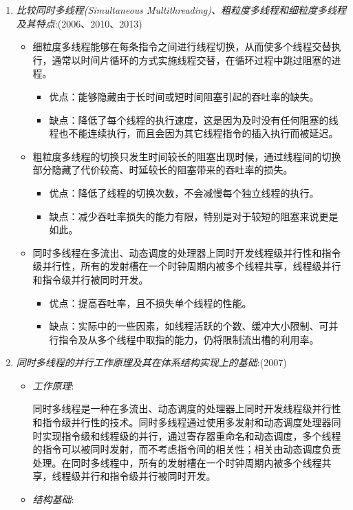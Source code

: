 \documentclass[a4paper]{ctexart}
\begin{document}
\begin{enumerate}
  \item \emph{比较同时多线程(Simultaneous Multithreading)、粗粒度多线程和细粒度多线程及其特点}:(2006、2010、2013)
  \begin{itemize}
    \item 细粒度多线程能够在每条指令之间进行线程切换，从而使多个线程交替执行，通常以时间片循环的方式实施线程交替，在循环过程中跳过阻塞的进程。
    \begin{itemize}
      \item 优点：能够隐藏由于长时间或短时间阻塞引起的吞吐率的缺失。
      \item 缺点：降低了每个线程的执行速度，这是因为及时没有任何阻塞的线程也不能连续执行，而且会因为其它线程指令的插入执行而被延迟。
    \end{itemize}
    \item 粗粒度多线程的切换只发生时间较长的阻塞出现时候，通过线程间的切换部分隐藏了代价较高、时延较长的阻塞带来的吞吐率的损失。
    \begin{itemize}
      \item 优点：降低了线程的切换次数，不会减慢每个独立线程的执行。
      \item 缺点：减少吞吐率损失的能力有限，特别是对于较短的阻塞来说更是如此。
    \end{itemize}
    \item 同时多线程在多流出、动态调度的处理器上同时开发线程级并行性和指令级并行性，所有的发射槽在一个时钟周期内被多个线程共享，线程级并行和指令级并行被同时开发。
    \begin{itemize}
      \item 优点：提高吞吐率，且不损失单个线程的性能。
      \item 缺点：实际中的一些因素，如线程活跃的个数、缓冲大小限制、可并行指令及从多个线程中取指的能力，仍将限制流出槽的利用率。
    \end{itemize}
  \end{itemize}
  
  \item \emph{同时多线程的并行工作原理及其在体系结构实现上的基础}:(2007)
  \begin{itemize}
    \item \emph{工作原理}:
    
    同时多线程是一种在多流出、动态调度的处理器上同时开发线程级并行性和指令级并行性的技术。同时多线程通过使用多发射和动态调度处理器同时实现指令级和线程级的并行，通过寄存器重命名和动态调度，多个线程的指令可以被同时发射，而不考虑指令间的相关性；相关由动态调度负责处理。在同时多线程中，所有的发射槽在一个时钟周期内被多个线程共享，线程级并行和指令级并行被同时开发。
    \item \emph{结构基础}:
    

\end{itemize}
\end{enumerate}
\end{document}
